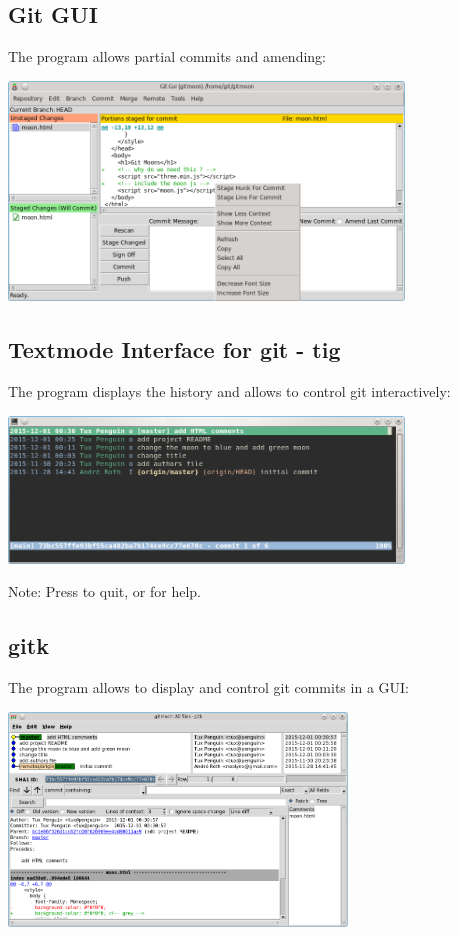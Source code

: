\subsection{Git GUI}
\begin{frame}[fragile]
  The program  allows partial commits and amending:
  \\
  \vspace{.5em}
  \centerline{\includegraphics[width=10.5cm]{../screen/git-gui.png}}
  \subslidetitle
\end{frame}

\subsection{Textmode Interface for git - tig}
\begin{frame}[fragile]
  \subslidetitle
  The program  displays the history and allows to control git interactively:
  \\
  \vspace{1em}
  \centerline{\includegraphics[width=10.5cm]{../screen/tig.png}}

  \vspace{1em}
  Note: Press  to quit, or  for help.
\end{frame}

\subsection{gitk}
\begin{frame}[fragile]
  \subslidetitle
  The program  allows to display and control git commits in a GUI:
  \\
  \vspace{1em}
  \centerline{\includegraphics[width=9cm]{../screen/gitk.png}}
\end{frame}

